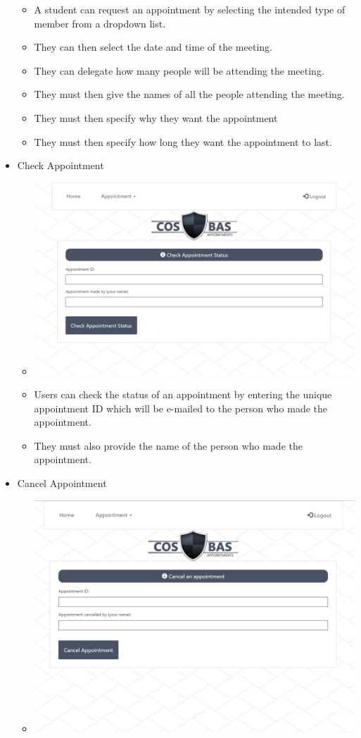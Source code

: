 \begin{itemize}
\begin{itemize}
				\item A student can request an appointment by selecting the intended type of member from a dropdown list.
				\item They can then select the date and time of the meeting.
				\item They can delegate how many people will be attending the meeting.
				\item They must then give the names of all the people attending the meeting.
				\item They must then specify why they want the appointment
				\item They must then specify how long they want the appointment to last.
			\end{itemize}
		\item Check Appointment
			\begin{itemize}
				\item \includegraphics[width=\linewidth]{images/Screenshots/CheckAppoint.png}
				\item Users can check the status of an appointment by entering the unique appointment ID which will be e-mailed to the person who made the appointment.
				\item They must also provide the name of the person who made the appointment.
			\end{itemize}
		\item Cancel Appointment
			\begin{itemize}
				\item \includegraphics[width=\linewidth]{images/Screenshots/CancelAppoint.png}

\end{itemize}
\end{itemize}
